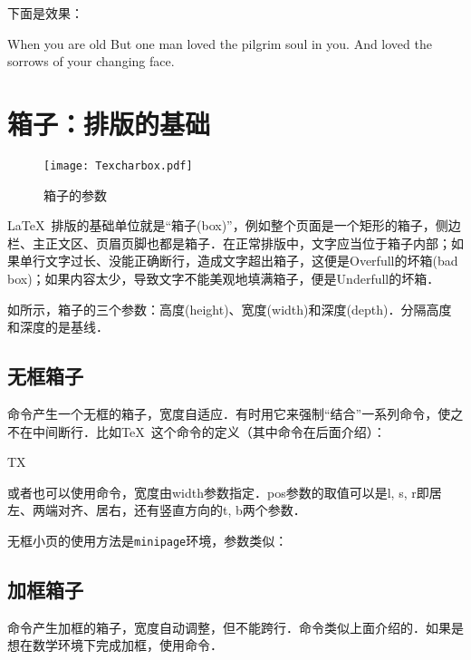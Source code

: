 下面是效果：
\begin{codeshow}
\begin{QuoteEnv}{When you are old}
But one man loved the pilgrim soul in you.
And loved the sorrows of your changing face.
\end{QuoteEnv}
\end{codeshow}

\section{箱子：排版的基础}
\label{sec:box}

\begin{wrapfigure}{R}{0.4\textwidth}
\texttt{[image: Texcharbox.pdf]}
\caption{箱子的参数}
\label{fig:boxpara}
\end{wrapfigure}

\LaTeX\ 排版的基础单位就是“箱子(box)”，例如整个页面是一个矩形的箱子，侧边栏、主正文区、页眉页脚也都是箱子．在正常排版中，文字应当位于箱子内部；如果单行文字过长、没能正确断行，造成文字超出箱子，这便是Overfull的坏箱(bad box)；如果内容太少，导致文字不能美观地填满箱子，便是Underfull的坏箱．

如所示，箱子的三个参数：高度(height)、宽度(width)和深度(depth)．分隔高度和深度的是基线．

\subsection{无框箱子}
命令产生一个无框的箱子，宽度自适应．有时用它来强制“结合”一系列命令，使之不在中间断行．比如\TeX\ 这个命令的定义（其中命令在后面介绍）：
\begin{latex}
\mbox{T\hspace{-0.1667em}\raisebox{-0.5ex}{E}\hspace{-0.125em}X}
\end{latex}

或者也可以使用命令，宽度由width参数指定．pos参数的取值可以是l, s, r即居左、两端对齐、居右，还有竖直方向的t, b两个参数．

无框小页的使用方法是\texttt{minipage}环境，参数类似：

\subsection{加框箱子}
命令产生加框的箱子，宽度自动调整，但不能跨行．命令类似上面介绍的．如果是想在数学环境下完成加框，使用命令．

